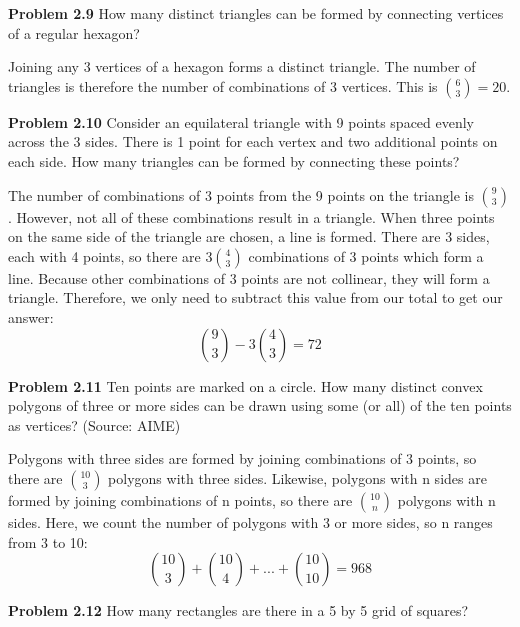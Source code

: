 \documentclass[11pt]{scrartcl}
\begin{document}
\begin{tcolorbox}
\textbf{Problem 2.9} How many distinct triangles can be formed by connecting vertices of a regular hexagon?
\end{tcolorbox}
\noindent 
Joining any 3 vertices of a hexagon forms a distinct triangle. The number of triangles is therefore the number of combinations of 3 vertices. This is ${{6 \choose 3}}=20$. 
\begin{tcolorbox}
\textbf{Problem 2.10} Consider an equilateral triangle with 9 points spaced evenly across the 3 sides. There is 1 point for each vertex and two additional points on each side. How many triangles can be formed by connecting these points?
\end{tcolorbox}
\noindent 
The number of combinations of 3 points from the 9 points on the triangle is ${{9 \choose 3}}$. However, not all of these combinations result in a triangle. When three points on the same side of the triangle are chosen, a line is formed. There are 3 sides, each with 4 points, so there are $3{{4 \choose 3}}$ combinations of 3 points which form a line. Because other combinations of 3 points are not collinear, they will form a triangle. Therefore, we only need to subtract this value from our total to get our answer: 
$${9 \choose 3}-3{4 \choose 3}=72$$
\begin{tcolorbox}
\textbf{Problem 2.11} Ten points are marked on a circle. How many distinct convex polygons of three or more sides can be drawn using some (or all) of the ten points as vertices? (Source: AIME)
\end{tcolorbox}
\noindent 
Polygons with three sides are formed by joining combinations of 3 points, so there are ${{10 \choose 3}}$ polygons with three sides. Likewise, polygons with n sides are formed by joining combinations of n points, so there are ${{10 \choose n}}$ polygons with n sides. Here, we count the number of polygons with 3 or more sides, so n ranges from 3 to 10: $${{10 \choose 3}}+{{10 \choose 4}}+...+{{10 \choose 10}}=968$$ 
\begin{tcolorbox}
\noindent
\textbf{Problem 2.12} How many rectangles are there in a 5 by 5 grid of squares?
\vspace*{+0.25cm}

\centering
{}
\end{tcolorbox}
\end{document}
